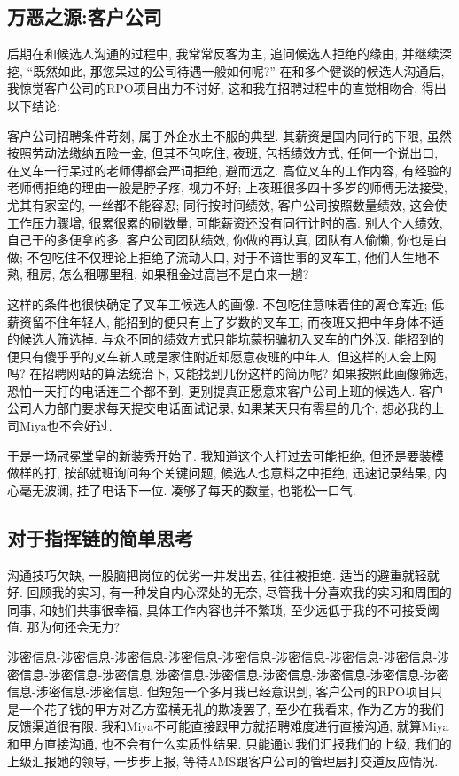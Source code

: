 \subsection{万恶之源:客户公司}
后期在和候选人沟通的过程中, 我常常反客为主, 追问候选人拒绝的缘由, 并继续深挖, ``既然如此, 那您呆过的公司待遇一般如何呢?'' 在和多个健谈的候选人沟通后, 我惊觉客户公司的RPO项目出力不讨好, 这和我在招聘过程中的直觉相吻合, 得出以下结论:

客户公司招聘条件苛刻, 属于外企水土不服的典型. 其薪资是国内同行的下限, 虽然按照劳动法缴纳五险一金, 但其不包吃住, 夜班, 包括绩效方式, 任何一个说出口, 在叉车一行呆过的老师傅都会严词拒绝, 避而远之. 高位叉车的工作内容, 有经验的老师傅拒绝的理由一般是脖子疼, 视力不好; 上夜班很多四十多岁的师傅无法接受, 尤其有家室的, 一丝都不能容忍; 同行按时间绩效, 客户公司按照数量绩效, 这会使工作压力骤增, 很累很累的刷数量, 可能薪资还没有同行计时的高. 别人个人绩效, 自己干的多便拿的多, 客户公司团队绩效, 你做的再认真, 团队有人偷懒, 你也是白做; 不包吃住不仅理论上拒绝了流动人口, 对于不谙世事的叉车工, 他们人生地不熟, 租房, 怎么租哪里租, 如果租金过高岂不是白来一趟? 

这样的条件也很快确定了叉车工候选人的画像. 不包吃住意味着住的离仓库近; 低薪资留不住年轻人, 能招到的便只有上了岁数的叉车工; 而夜班又把中年身体不适的候选人筛选掉. 与众不同的绩效方式只能坑蒙拐骗初入叉车的门外汉. 能招到的便只有傻乎乎的叉车新人或是家住附近却愿意夜班的中年人. 但这样的人会上网吗? 在招聘网站的算法统治下, 又能找到几份这样的简历呢? 如果按照此画像筛选, 恐怕一天打的电话连三个都不到, 更别提真正愿意来客户公司上班的候选人. 客户公司人力部门要求每天提交电话面试记录, 如果某天只有零星的几个, 想必我的上司Miya也不会好过. 

于是一场冠冕堂皇的新装秀开始了. 我知道这个人打过去可能拒绝, 但还是要装模做样的打, 按部就班询问每个关键问题, 候选人也意料之中拒绝, 迅速记录结果, 内心毫无波澜, 挂了电话下一位. 凑够了每天的数量, 也能松一口气. 

\subsection{对于指挥链的简单思考}
沟通技巧欠缺, 一股脑把岗位的优劣一并发出去, 往往被拒绝. 适当的避重就轻就好. 回顾我的实习, 有一种发自内心深处的无奈, 尽管我十分喜欢我的实习和周围的同事, 和她们共事很幸福, 具体工作内容也并不繁琐, 至少远低于我的不可接受阈值. 那为何还会无力?

涉密信息-涉密信息-涉密信息-涉密信息-涉密信息-涉密信息-涉密信息-涉密信息-涉密信息-涉密信息-涉密信息.涉密信息-涉密信息-涉密信息-涉密信息-涉密信息-涉密信息-涉密信息-涉密信息. 但短短一个多月我已经意识到, 客户公司的RPO项目只是一个花了钱的甲方对乙方蛮横无礼的欺凌罢了, 至少在我看来, 作为乙方的我们反馈渠道很有限. 我和Miya不可能直接跟甲方就招聘难度进行直接沟通, 就算Miya和甲方直接沟通, 也不会有什么实质性结果. 只能通过我们汇报我们的上级, 我们的上级汇报她的领导, 一步步上报, 等待AMS跟客户公司的管理层打交道反应情况.

